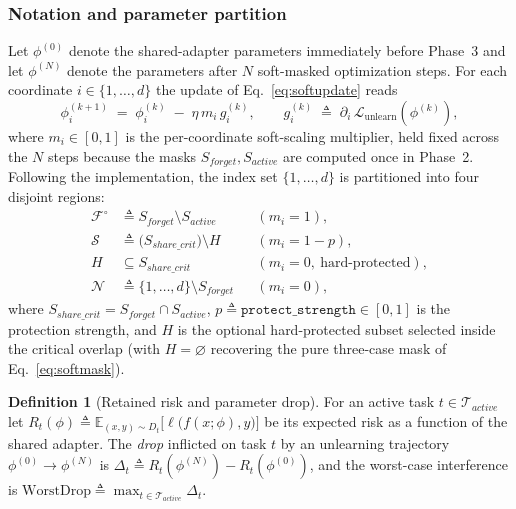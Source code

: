 \documentclass[conference]{IEEEtran}
\theoremstyle{plain}
\theoremstyle{definition}
\newtheorem{definition}{Definition}
\theoremstyle{remark}
\begin{document}
\subsubsection*{Notation and parameter partition}

Let $\phi^{(0)}$ denote the shared-adapter parameters immediately
before Phase~3 and let $\phi^{(N)}$ denote the parameters after $N$
soft-masked optimization steps. For each coordinate
$i\in\{1,\dots,d\}$ the update of Eq.~\eqref{eq:softupdate} reads
\begin{equation}
\label{eq:coord-update}
\phi^{(k+1)}_{i} \;=\; \phi^{(k)}_{i}
       \;-\; \eta\, m_{i}\, g^{(k)}_{i},
\qquad
g^{(k)}_{i}\;\triangleq\;\partial_{i}\,\mathcal{L}_{\text{unlearn}}\!\left(\phi^{(k)}\right),
\end{equation}
where $m_{i}\in[0,1]$ is the per-coordinate soft-scaling multiplier,
held fixed across the $N$ steps because the masks
$S_{forget},S_{active}$ are computed once in Phase~2. Following the
implementation, the index set $\{1,\dots,d\}$ is partitioned into four
disjoint regions:
\begin{equation}
\label{eq:partition}
\begin{aligned}
\mathcal{F}^{\!\circ} &\triangleq S_{forget}\setminus S_{active}
   && (m_i = 1), \\
\mathcal{S} &\triangleq \big(S_{share\_crit}\big)\setminus H
   && (m_i = 1-p), \\
H &\subseteq S_{share\_crit}
   && (m_i = 0,\ \text{hard-protected}), \\
\mathcal{N} &\triangleq \{1,\dots,d\}\setminus S_{forget}
   && (m_i = 0),
\end{aligned}
\end{equation}
where $S_{share\_crit}=S_{forget}\cap S_{active}$,
$p\triangleq\texttt{protect\_strength}\in[0,1]$ is the protection
strength, and $H$ is the optional hard-protected subset selected
inside the critical overlap (with $H=\varnothing$ recovering the pure
three-case mask of Eq.~\eqref{eq:softmask}).

\begin{definition}[Retained risk and parameter drop]
\label{def:drop}
For an active task $t\in\mathcal{T}_{active}$ let
$R_{t}(\phi)\triangleq\mathbb{E}_{(x,y)\sim D_{t}}\big[\ell\big(f(x;\phi),y\big)\big]$
be its expected risk as a function of the shared adapter. The
\emph{drop} inflicted on task $t$ by an unlearning trajectory
$\phi^{(0)}\!\to\!\phi^{(N)}$ is
$\Delta_{t}\triangleq R_{t}(\phi^{(N)})-R_{t}(\phi^{(0)})$, and the
worst-case interference is
$\mathrm{WorstDrop}\triangleq\max_{t\in\mathcal{T}_{active}}\Delta_{t}$.
\end{definition}
\end{document}
